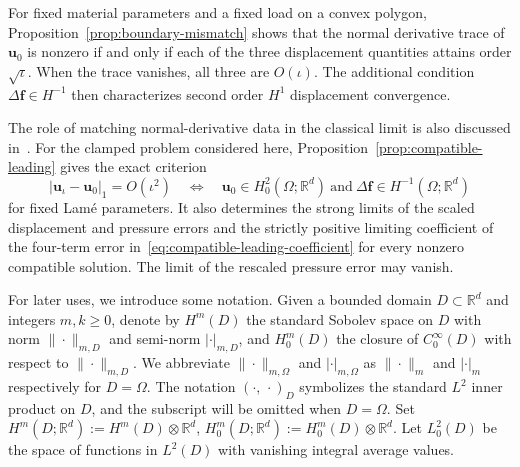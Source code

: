 \documentclass[10pt]{amsart}
\numberwithin{equation}{section}
\begin{document}
For fixed material parameters and a fixed load on a convex polygon, Proposition~\ref{prop:boundary-mismatch} shows that the normal derivative trace of $\boldsymbol u_0$ is nonzero if and only if each of the three displacement quantities attains order $\sqrt\iota$. When the trace vanishes, all three are $O(\iota)$. The additional condition $\Delta\boldsymbol f\in H^{-1}$ then characterizes second order $H^1$ displacement convergence.

The role of matching normal-derivative data in the classical limit is also discussed in~\cite[Theorem~3]{CharalambopoulosGortsasPolyzos2022}. For the clamped problem considered here, Proposition~\ref{prop:compatible-leading} gives the exact criterion
\[
|\boldsymbol u_\iota-\boldsymbol u_0|_1=O(\iota^2)
\quad\Longleftrightarrow\quad
\boldsymbol u_0\in H_0^2(\Omega;\mathbb R^d)
\ \text{and}\ \Delta\boldsymbol f\in H^{-1}(\Omega;\mathbb R^d)
\]
for fixed Lam\'e parameters. It also determines the strong limits of the scaled displacement and pressure errors and the strictly positive limiting coefficient of the four-term error in~\eqref{eq:compatible-leading-coefficient} for every nonzero compatible solution. The limit of the rescaled pressure error may vanish.

For later uses, we introduce some notation.
Given a bounded domain $D\subset \mathbb{R}^{d}$
and integers $m,k\geq0$, denote by $H^m(D)$ the standard Sobolev space on $D$
with norm $\|\cdot\|_{m,D}$ and semi-norm $|\cdot|_{m,D}$, and $H_0^m(D)$ the closure of $C_0^{\infty}(D)$ with respect to $\|\cdot\|_{m,D}$. We abbreviate $\|\cdot\|_{m,\Omega}$ and $|\cdot|_{m,\Omega}$ as $\|\cdot\|_{m}$ and $|\cdot|_{m}$ respectively for $D=\Omega$.
The notation $(\cdot,\,\cdot)_{D}$ symbolizes the standard $L^2$ inner product on $D$, and the subscript will be omitted when $D=\Omega$.
Set  $H^m(D; \mathbb R^d) :=H^m(D)\otimes\mathbb R^d$, $H_0^m(D; \mathbb R^d) :=H_0^m(D)\otimes\mathbb R^d$.
Let $L^2_0(D)$ be the space of functions in $L^2(D)$ with vanishing integral average values.
\end{document}
